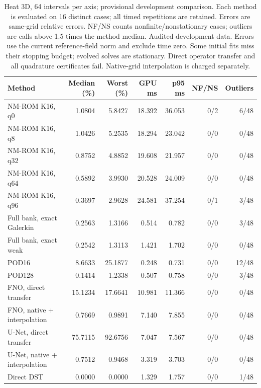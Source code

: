 \begin{table}[htbp]
\centering
\small
\setlength{\tabcolsep}{3pt}
\begin{tabular}{lrrrrrr}
\toprule
Method & Median (\%) & Worst (\%) & GPU ms & p95 ms & NF/NS & Outliers \\
\midrule
NM-ROM K16, q0 & 1.0804 & 5.8427 & 18.392 & 36.053 & 0/2 & 6/48 \\
NM-ROM K16, q8 & 1.0426 & 5.2535 & 18.294 & 23.042 & 0/0 & 0/48 \\
NM-ROM K16, q32 & 0.8752 & 4.8852 & 19.608 & 21.957 & 0/0 & 0/48 \\
NM-ROM K16, q64 & 0.5892 & 3.9930 & 20.528 & 24.009 & 0/0 & 0/48 \\
NM-ROM K16, q96 & 0.3697 & 2.9628 & 24.581 & 37.254 & 0/1 & 3/48 \\
Full bank, exact Galerkin & 0.2563 & 1.3166 & 0.514 & 0.782 & 0/0 & 3/48 \\
Full bank, exact weak & 0.2542 & 1.3113 & 1.421 & 1.702 & 0/0 & 0/48 \\
POD16 & 8.6633 & 25.1877 & 0.248 & 0.731 & 0/0 & 12/48 \\
POD128 & 0.1414 & 1.2338 & 0.507 & 0.758 & 0/0 & 3/48 \\
FNO, direct transfer & 15.1234 & 17.6641 & 10.981 & 11.366 & 0/0 & 0/48 \\
FNO, native + interpolation & 0.7669 & 0.9891 & 7.140 & 7.855 & 0/0 & 0/48 \\
U-Net, direct transfer & 75.7115 & 92.6756 & 7.047 & 7.567 & 0/0 & 0/48 \\
U-Net, native + interpolation & 0.7512 & 0.9468 & 3.319 & 3.703 & 0/0 & 0/48 \\
Direct DST & 0.0000 & 0.0000 & 1.329 & 1.757 & 0/0 & 1/48 \\
\bottomrule
\end{tabular}
\caption{Heat 3D, 64 intervals per axis; provisional development comparison. Each method is evaluated on 16 distinct cases; all timed repetitions are retained. Errors are same-grid relative errors. NF/NS counts nonfinite/nonstationary cases; outliers are calls above 1.5 times the method median. Audited development data. Errors use the current reference-field norm and exclude time zero. Some initial fits miss their stopping budget; evolved solves are stationary. Direct operator transfer and all quadrature certificates fail. Native-grid interpolation is charged separately.}
\label{tab:heat3d-tune02-n64}
\end{table}
